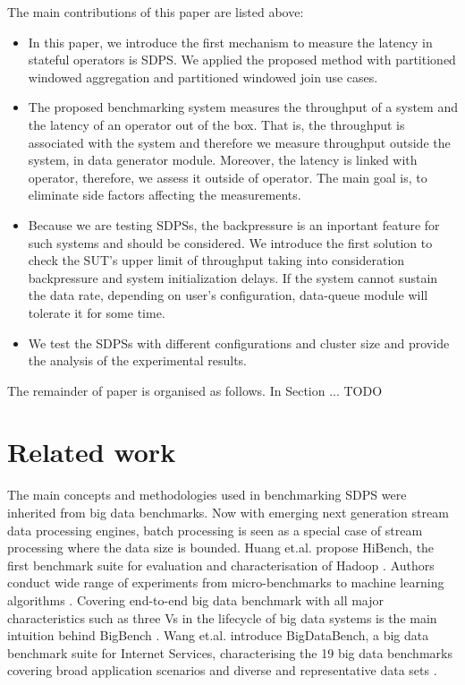 \documentclass{vldb}
\begin{document}
The main contributions of this paper are listed above:
\begin{itemize}  
\item In this paper, we  introduce  the first mechanism to measure the latency in stateful operators is SDPS. We applied the proposed method with partitioned windowed aggregation and partitioned windowed join use cases. 
\item The proposed benchmarking system measures the throughput of a system and the latency of an operator out of the box. That is, the throughput is associated with the system and therefore we measure throughput outside the system, in data generator module. Moreover, the latency is linked with operator, therefore, we assess it outside of operator. The main goal is, to eliminate side factors affecting the measurements. 
\item Because we are testing SDPSs, the backpressure is an inportant feature for such systems and should be considered. We introduce the first solution to check the SUT's upper limit of throughput taking into consideration backpressure and system initialization delays. If the system cannot sustain the data rate, depending on user's configuration,  data-queue module will tolerate it for some time.
\item We test the SDPSs with different  configurations and cluster size and provide the analysis of the experimental results.
\end{itemize}

The remainder of paper is organised as follows. In Section ... TODO

\section{Related work}
The main concepts and methodologies used in benchmarking SDPS were inherited from big data benchmarks.
Now with emerging next generation stream data processing engines, batch processing is seen as a special case of stream processing where the data size is bounded. Huang et.al. propose HiBench, the first benchmark suite for evaluation and characterisation of Hadoop \cite{white2012hadoop}. Authors conduct wide range of experiments from micro-benchmarks to machine learning algorithms \cite{huang2011hibench}. Covering end-to-end big data benchmark with all major characteristics such as three Vs in the lifecycle of big data systems is the main intuition behind BigBench \cite{ghazal2013bigbench}. Wang et.al. introduce BigDataBench, a big data benchmark suite for Internet Services, characterising the 19 big data benchmarks covering broad application scenarios and diverse and representative data sets \cite{wang2014bigdatabench}.
\end{document}
